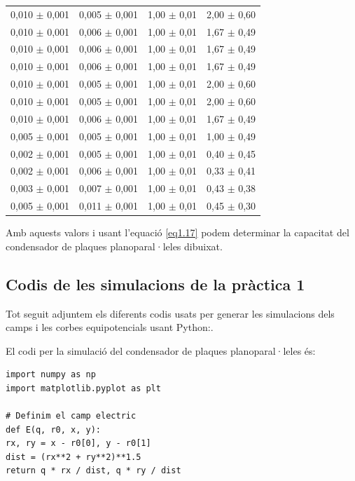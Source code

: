 \documentclass[a4paper,10.5pt]{report}
\begin{document}
\begin{appendices}
\begin{table}[h]
\begin{tabular}{cccc}
		0,010 $\pm$ 0,001 & 0,005 $\pm$ 0,001 & 1,00 $\pm$ 0,01 & 2,00 $\pm$ 0,60 \\
		0,010 $\pm$ 0,001 & 0,006 $\pm$ 0,001 & 1,00 $\pm$ 0,01 & 1,67 $\pm$ 0,49 \\
		0,010 $\pm$ 0,001 & 0,006 $\pm$ 0,001 & 1,00 $\pm$ 0,01 & 1,67 $\pm$ 0,49 \\
		0,010 $\pm$ 0,001 & 0,006 $\pm$ 0,001 & 1,00 $\pm$ 0,01 & 1,67 $\pm$ 0,49 \\
		0,010 $\pm$ 0,001 & 0,005 $\pm$ 0,001 & 1,00 $\pm$ 0,01 & 2,00 $\pm$ 0,60 \\
		0,010 $\pm$ 0,001 & 0,005 $\pm$ 0,001 & 1,00 $\pm$ 0,01 & 2,00 $\pm$ 0,60 \\
		0,010 $\pm$ 0,001 & 0,006 $\pm$ 0,001 & 1,00 $\pm$ 0,01 & 1,67 $\pm$ 0,49 \\
		0,005 $\pm$ 0,001 & 0,005 $\pm$ 0,001 & 1,00 $\pm$ 0,01 & 1,00 $\pm$ 0,49 \\
		0,002 $\pm$ 0,001 & 0,005 $\pm$ 0,001 & 1,00 $\pm$ 0,01 & 0,40 $\pm$ 0,45 \\
		0,002 $\pm$ 0,001 & 0,006 $\pm$ 0,001 & 1,00 $\pm$ 0,01 & 0,33 $\pm$ 0,41 \\
		0,003 $\pm$ 0,001 & 0,007 $\pm$ 0,001 & 1,00 $\pm$ 0,01 & 0,43 $\pm$ 0,38 \\
		0,005 $\pm$ 0,001 & 0,011 $\pm$ 0,001 & 1,00 $\pm$ 0,01 & 0,45 $\pm$ 0,30 \\
		\bottomrule
	\end{tabular}
	\label{tab:valores}
\end{table}


Amb aquests valors i usant l'equació \eqref{eq1.17} podem determinar la capacitat del condensador de plaques planoparal·leles dibuixat.

\newpage
\subsection{Codis de les simulacions de la pràctica 1}
\label{an:a4}
Tot seguit adjuntem els diferents codis usats per generar les simulacions dels camps i les corbes equipotencials usant Python:.

El codi per la simulació del condensador de plaques planoparal·leles és:
\begin{lstlisting}
import numpy as np
import matplotlib.pyplot as plt

# Definim el camp electric 
def E(q, r0, x, y):
rx, ry = x - r0[0], y - r0[1]
dist = (rx**2 + ry**2)**1.5
return q * rx / dist, q * ry / dist


\end{lstlisting}
\end{appendices}
\end{document}
